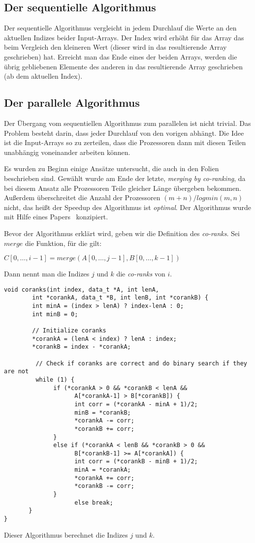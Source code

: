 \subsection{Der sequentielle Algorithmus}
Der sequentielle Algorithmus vergleicht in jedem Durchlauf die Werte an den aktuellen Indizes beider Input-Arrays. Der Index wird erhöht für das Array das beim Vergleich den kleineren Wert (dieser wird in das resultierende Array geschrieben) hat. Erreicht man das Ende eines der beiden Arrays, werden die übrig gebliebenen Elemente des anderen in das resultierende Array geschrieben (ab dem aktuellen Index).

\subsection{Der parallele Algorithmus}
Der Übergang vom sequentiellen Algorithmus zum parallelen ist nicht trivial. Das Problem besteht darin, dass jeder Durchlauf von den vorigen abhängt. Die Idee ist die Input-Arrays so zu zerteilen, dass die Prozessoren dann mit diesen Teilen unabhängig voneinander arbeiten können.

Es wurden zu Beginn einige Ansätze untersucht, die auch in den Folien beschrieben sind. Gewählt wurde am Ende der letzte, \emph{merging by co-ranking}, da bei diesem Ansatz alle Prozessoren Teile gleicher Länge übergeben bekommen. Außerdem überschreitet die Anzahl der Prozessoren $(m+n) / log min(m,n)$ nicht, das heißt der Speedup des Algorithmus ist \emph{optimal}. Der Algorithmus wurde mit Hilfe eines Papers~\cite{corank} konzipiert.

Bevor der Algorithmus erklärt wird, geben wir die Definition des \emph{co-ranks}. Sei $merge$ die Funktion, für die gilt:
\begin{center}
$C[0,\dots,i-1] = merge(A[0,\dots,j-1], B[0,\dots,k-1])$
\end{center}
Dann nennt man die Indizes $j$ und $k$ die \emph{co-ranks} von $i$.
\begin{verbatim}
void coranks(int index, data_t *A, int lenA, 
        int *corankA, data_t *B, int lenB, int *corankB) {
        int minA = (index > lenA) ? index-lenA : 0;
        int minB = 0;

        // Initialize coranks
        *corankA = (lenA < index) ? lenA : index;
        *corankB = index - *corankA;

         // Check if coranks are correct and do binary search if they are not
         while (1) {
              if (*corankA > 0 && *corankB < lenA && 
                    A[*corankA-1] > B[*corankB]) {
                    int corr = (*corankA - minA + 1)/2;
                    minB = *corankB;
                    *corankA -= corr;
                    *corankB += corr;
              }
              else if (*corankA < lenB && *corankB > 0 && 
                    B[*corankB-1] >= A[*corankA]) {
                    int corr = (*corankB - minB + 1)/2;
                    minA = *corankA;
                    *corankA += corr;
                    *corankB -= corr;
              }
                    else break;
       }
}
\end{verbatim}

Dieser Algorithmus berechnet die Indizes $j$ und $k$. 